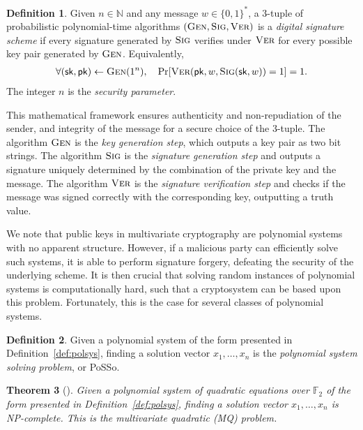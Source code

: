 \documentclass[12pt, a4paper, oneside]{memoir}
\newtheorem{theorem}{Theorem}[section]
\theoremstyle{definition}
\newtheorem{definition}[theorem]{Definition}
\begin{document}
\begin{definition}
  Given $n \in \mathbb{N}$ and any message $w \in \{0, 1\}^{*}$, a $3$-tuple of probabilistic polynomial-time algorithms $(\textsc{Gen}, \textsc{Sig}, \textsc{Ver})$ is a \emph{digital signature scheme} if every signature generated by $\textsc{Sig}$ verifies under $\textsc{Ver}$ for every possible key pair generated by $\textsc{Gen}$. Equivalently,
  \begin{align}
     \forall (\mathsf{sk}, \mathsf{pk}) \leftarrow \textsc{Gen}(1^{n}),
       \quad \Pr[\textsc{Ver}(\mathsf{pk}, w, \textsc{Sig}(\mathsf{sk}, w)) = 1] = 1.
  \end{align}
  The integer $n$ is the \emph{security parameter}.
\end{definition}

This mathematical framework ensures authenticity and non-repudiation of the sender, and integrity of the message for a secure choice of the $3$-tuple. The algorithm $\textsc{Gen}$ is the \emph{key generation step}, which outputs a key pair as two bit strings. The algorithm $\textsc{Sig}$ is the \emph{signature generation step} and outputs a signature uniquely determined by the combination of the private key and the message. The algorithm $\textsc{Ver}$ is the \emph{signature verification step} and checks if the message was signed correctly with the corresponding key, outputting a truth value.

We note that public keys in multivariate cryptography are polynomial systems with no apparent structure. However, if a malicious party can efficiently solve such systems, it is able to perform signature forgery, defeating the security of the underlying scheme. It is then crucial that solving random instances of polynomial systems is computationally hard, such that a cryptosystem can be based upon this problem. Fortunately, this is the case for several classes of polynomial systems.

\begin{definition}\label{def:posso}
  Given a polynomial system of the form presented in Definition~\ref{def:polsys}, finding a solution vector $x_{1}, \dots, x_{n}$ is the \emph{polynomial system solving problem}, or \textsf{PoSSo}.
\end{definition}

\begin{theorem}[{\cite[Appendix A]{Patarin:199711}}]
  Given a polynomial system of \emph{quadratic equations over $\mathbb{F}_{2}$} of the form presented in Definition~\ref{def:polsys}, finding a solution vector $x_{1}, \dots, x_{n}$ is NP-complete. This is the \emph{multivariate quadratic (MQ) problem}.
\end{theorem}
\end{document}
